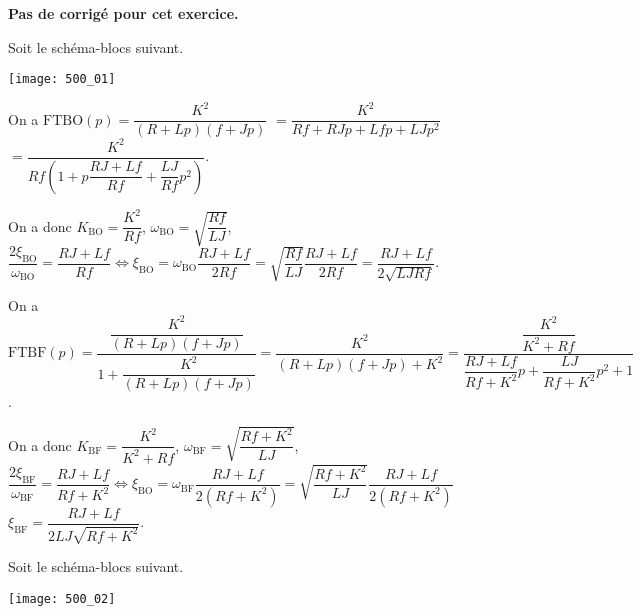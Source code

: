 \normaltrue \difficilefalse \tdifficilefalse
\correctiontrue


\setcounter{numques}{0}

\ifcorrection
\else
\textbf{Pas de corrigé pour cet exercice.}
\fi


\ifprof 
\else
Soit le schéma-blocs suivant.
\begin{center}
\texttt{[image: 500\_01]}
\end{center}
 \fi
 
\ifprof
On a $\text{FTBO}(p)=\dfrac{K^2}{\left(R+Lp\right)\left(f+Jp\right)}$
$=\dfrac{K^2}{Rf+RJp+Lfp+LJp^2}$
$=\dfrac{K^2}{Rf\left(1+p\dfrac{RJ+Lf}{Rf}+\dfrac{LJ}{Rf}p^2\right)}$.

On a donc $K_{\text{BO}}=\dfrac{K^2}{Rf}$, 
$\omega_{\text{BO}} = \sqrt{\dfrac{Rf}{LJ}}$,
$\dfrac{2\xi_{\text{BO}} }{\omega_{\text{BO}}}=\dfrac{RJ+Lf}{Rf} \Leftrightarrow
\xi_{\text{BO}} =\omega_{\text{BO}}\dfrac{RJ+Lf}{2Rf}
=\sqrt{\dfrac{Rf}{LJ}}\dfrac{RJ+Lf}{2Rf}
=\dfrac{RJ+Lf}{2\sqrt{LJRf}}$.
\else 
\fi

\ifprof
On a $\text{FTBF}(p)=\dfrac{\dfrac{K^2}{\left(R+Lp\right)\left(f+Jp\right)}}{1+\dfrac{K^2}{\left(R+Lp\right)\left(f+Jp\right)}}
=\dfrac{K^2}{\left(R+Lp\right)\left(f+Jp\right)+K^2}
=\dfrac{\dfrac{K^2}{K^2+Rf}}{\dfrac{RJ+Lf}{Rf+K^2}p+\dfrac{LJ}{Rf+K^2}p^2+1}$.



On a donc $K_{\text{BF}}=\dfrac{K^2}{K^2+Rf}$, 
$\omega_{\text{BF}} = \sqrt{\dfrac{Rf+K^2}{LJ}}$,
$\dfrac{2\xi_{\text{BF}} }{\omega_{\text{BF}}}=\dfrac{RJ+Lf}{Rf+K^2} \Leftrightarrow
\xi_{\text{BO}} =\omega_{\text{BF}}\dfrac{RJ+Lf}{2\left(Rf+K^2\right)}
=\sqrt{\dfrac{Rf+K^2}{LJ}}\dfrac{RJ+Lf}{2\left(Rf+K^2\right)}$
%
$\xi_{\text{BF}}=\dfrac{RJ+Lf}{2LJ\sqrt{Rf+K^2}}$.
\else 
\fi

\ifprof 
\else
Soit le schéma-blocs suivant.
\begin{center}
\texttt{[image: 500\_02]}
\end{center}
 \fi
 

